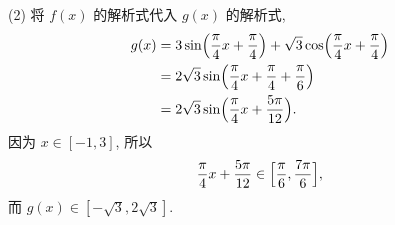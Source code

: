     (2) 将 $f(x)$ 的解析式代入 $g(x)$ 的解析式,
    \[\begin{aligned}
        g(x)&= 3\sin\Bigl(\frac\pi4 x+ \frac\pi4\Bigr)
            + \sqrt3\cos\Bigl(\frac\pi4 x+ \frac\pi4\Bigr)\\
        &= 2\sqrt3\sin\Bigl(\frac\pi4 x+ \frac\pi4+ \frac\pi6\Bigr)\\
        &= 2\sqrt3\sin\Bigl(\frac\pi4 x+ \frac{5\pi}{12}\Bigr).
    \end{aligned}\]
    因为 $x\in[-1,3]$, 所以
    \[\frac\pi4 x+ \frac{5\pi}{12}\in \Bigl[\frac\pi6, \frac{7\pi}{6}\Bigr],\]
    而 $g(x)\in[-\sqrt3, 2\sqrt3]$.
\endsolution

